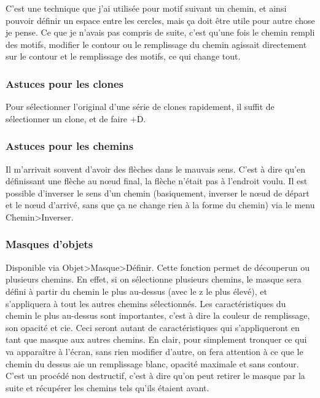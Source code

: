 \documentclass[a4paper,twoside]{article}
\begin{document}
\begin{remarque}
C'est une technique que j'ai utilisée pour \og motif suivant un chemin\fg, et ainsi pouvoir définir un espace entre les cercles, mais ça doit être utile pour autre chose je pense. Ce que je n'avais pas compris de suite, c'est qu'une fois le chemin rempli des motifs, modifier le contour ou le remplissage du chemin agissait directement sur le contour et le remplissage des motifs, ce qui change tout.
\end{remarque}

\subsubsection{Astuces pour les clones}
Pour sélectionner l'original d'une série de clones rapidement, il suffit de sélectionner un clone, et de faire +D.

\subsubsection{Astuces pour les chemins}
Il m'arrivait souvent d'avoir des flèches dans le mauvais sens. C'est à dire qu'en définissant une flèche au n\oe ud final, la flèche n'était pas à l'endroit voulu. Il est possible d'inverser le sens d'un chemin (basiquement, inverser le n\oe ud de départ et le n\oe ud d'arrivé, sans que ça ne change rien à la forme du chemin) via le menu Chemin>Inverser.

\subsubsection{Masques d'objets}
Disponible via Objet>Masque>Définir. Cette fonction permet de \og découper\fg un ou plusieurs chemins. En effet, si on sélectionne plusieurs chemins, le masque sera défini à partir du chemin le plus au-dessus (avec le z le plus élevé), et s'appliquera à tout les autres chemins sélectionnés. Les caractéristiques du chemin le plus au-dessus sont importantes, c'est à dire la couleur de remplissage, son opacité et cie. Ceci seront autant de caractéristiques qui s'appliqueront en tant que masque aux autres chemins. En clair, pour simplement tronquer ce qui va apparaître à l'écran, sans rien modifier d'autre, on fera attention à ce que le chemin du dessus aie un remplissage blanc, opacité maximale et sans contour. C'est un procédé non destructif, c'est à dire qu'on peut retirer le masque par la suite et récupérer les chemins tels qu'ils étaient avant.
\end{document}
